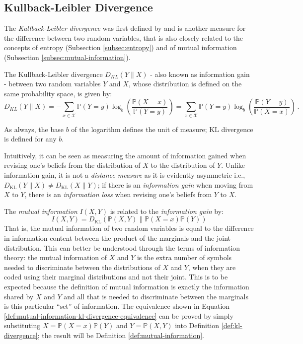 \subsection{Kullback-Leibler Divergence} \label{subsec:kl-divergence}
The \textit{Kullback-Leibler divergence} was first defined by \citet{Kingman2007} and is another measure for the difference between two random variables, that is also closely related to the concepts of entropy (Subsection \ref{subsec:entropy}) and of mutual information (Subsection \ref{subsec:mutual-information}).
\begin{definition} \label{def:kl-divergence}
	The Kullback-Leibler divergence $D_{KL}(Y \parallel X)$ - also known as information gain - between two random variables $Y$ and $X$, whose distribution is defined on the same probability space, is given by:
	\begin{equation*} 
		D_{KL}(Y \parallel X)=-\sum\limits_{x \in \mathcal{X}} \mathbb{P}(Y=y) \log_{b} \left(\frac{\mathbb{P}(X=x)}{\mathbb{P}(Y=y)}\right) = \sum\limits_{x \in \mathcal{X}} \mathbb{P}(Y=y) \log_{b} \left(\frac{\mathbb{P}(Y=y)}{\mathbb{P}(X=x)}\right) \,.
	\end{equation*}
\end{definition}
As always, the base $b$ of the logarithm defines the unit of measure; KL divergence is defined for any $b$.

Intuitively, it can be seen as measuring the amount of information gained when revising one's beliefs from the distribution of $X$ to the distribution of $Y$.
Unlike information gain, it is not a \textit{distance measure} as it is evidently asymmetric i.e., $D_{\mathrm{KL}}(Y \parallel X) \neq D_{\mathrm{KL}}(X \parallel Y)$; if there is an \textit{information gain} when moving from $X$ to $Y$, there is an \textit{information loss} when revising one's beliefs from $Y$ to $X$.

The \textit{mutual information} $I(X,Y)$ is related to the \textit{information gain} by:
\begin{equation} \label{def:mutual-information-kl-divergence-equivalence}
	I(X,Y) = D_{\mathrm{KL}}(\mathbb{P}(X,Y) \| \mathbb{P}(X=x) \mathbb{P}(Y) )
\end{equation}
That is, the mutual information of two random variables is equal to the difference in information content between the product of the marginals and the joint distribution.
This can better be understood through the terms of information theory: the mutual information of $X$ and $Y$ is the extra number of symbols needed to discriminate between the distributions of $X$ and $Y$, when they are coded using their marginal distributions and not their joint.
This is to be expected because the definition of mutual information is exactly the information shared by $X$ and $Y$ and all that is needed to discriminate between the marginals is this particular \enquote{set} of information.
The equivalence shown in Equation \ref{def:mutual-information-kl-divergence-equivalence} can be proved by simply substituting $X=\mathbb{P}(X=x) \mathbb{P}(Y)$ and $Y=\mathbb{P}(X,Y)$ into Definition \ref{def:kl-divergence}; the result will be Definition \ref{def:mutual-information}.

